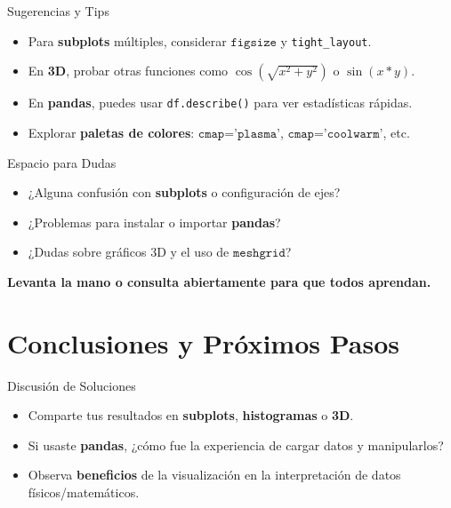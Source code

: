 \documentclass[10pt]{beamer}
\begin{document}
\begin{frame}{Sugerencias y Tips}
  \begin{itemize}
    \item Para \textbf{subplots} múltiples, considerar \(\texttt{figsize}\) y \texttt{tight\_layout}.
    \item En \textbf{3D}, probar otras funciones como \(\cos(\sqrt{x^2 + y^2})\) o \(\sin(x*y)\).
    \item En \textbf{pandas}, puedes usar \texttt{df.describe()} para ver estadísticas rápidas.
    \item Explorar \textbf{paletas de colores}: \(\texttt{cmap='plasma'}\), \(\texttt{cmap='coolwarm'}\), etc.
  \end{itemize}
\end{frame}

\begin{frame}{Espacio para Dudas}
  \begin{itemize}
    \item ¿Alguna confusión con \textbf{subplots} o configuración de ejes?
    \item ¿Problemas para instalar o importar \textbf{pandas}?
    \item ¿Dudas sobre gráficos 3D y el uso de \(\texttt{meshgrid}\)?
  \end{itemize}
  \vspace{0.2cm}
  \textbf{Levanta la mano o consulta abiertamente para que todos aprendan.}
\end{frame}






\section{Conclusiones y Próximos Pasos}

\begin{frame}{Discusión de Soluciones}
  \begin{itemize}
    \item Comparte tus resultados en \textbf{subplots}, \textbf{histogramas} o \textbf{3D}.
    \item Si usaste \textbf{pandas}, ¿cómo fue la experiencia de cargar datos y manipularlos?
    \item Observa \textbf{beneficios} de la visualización en la interpretación de datos físicos/matemáticos.
  \end{itemize}
\end{frame}
\end{document}

